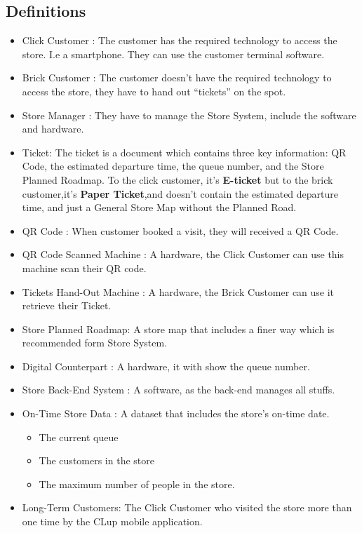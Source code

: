 \documentclass[a4paper,12pt]{report}
\begin{document}
\subsection{Definitions}\label{Definitions}
\begin{itemize}
	\item Click Customer : The customer has the required technology to access the store. I.e a smartphone. They can use the customer terminal software.
	\item Brick Customer : The customer doesn't have the required technology to access the store, they have to hand out “tickets” on the spot.
	\item Store Manager : They have to manage the Store System, include the software and hardware.
	\item Ticket: The ticket is a document which contains three key information: QR Code, the estimated departure time, the queue number, and the Store Planned Roadmap. To the click customer, it's \textbf{E-ticket} but to the brick customer,it's \textbf{Paper Ticket},and doesn't contain the estimated departure time, and just a General Store Map without the Planned Road.
	\item QR Code : When customer booked a visit, they will received a QR Code.
	\item QR Code Scanned Machine : A hardware, the Click Customer can use this machine scan their QR code.
	\item Tickets Hand-Out Machine : A hardware, the Brick Customer can use it retrieve their Ticket.
	\item Store Planned Roadmap: A store map that includes a finer way which is recommended form Store System.
	\item Digital Counterpart : A hardware, it with show the queue number.
	\item Store Back-End System : A software, as the back-end manages all stuffs.
	\item On-Time Store Data : A dataset that includes the store's on-time date.
		\begin{itemize}
		\item The current queue 
		\item The customers in the store
		\item The maximum number of people in the store.
		\end{itemize}
	\item Long-Term Customers: The Click Customer who visited the store more than one time by the CLup mobile application.
\end{itemize}
\end{document}
